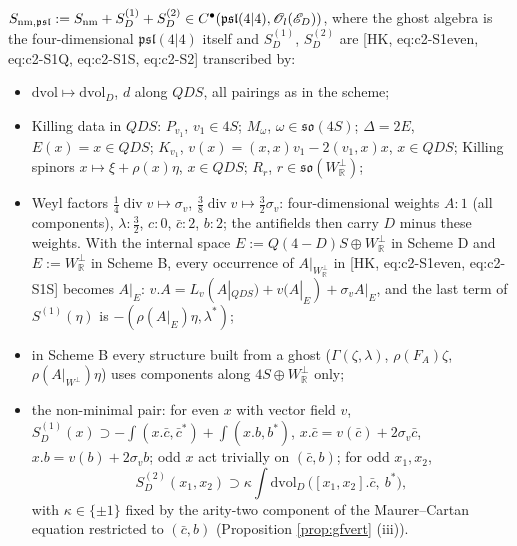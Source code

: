 \begin{definition}
\label{def:equiv}
$S_{{\rm nm},\mathfrak{psl}}:=S_{\rm nm}+S^{(1)}_D+S^{(2)}_D\in C^\bullet(\mathfrak{psl}(4|4),\mathscr O_l(\mathscr E_D))$, where the ghost algebra is the four-dimensional $\mathfrak{psl}(4|4)$ itself and $S^{(1)}_D$, $S^{(2)}_D$ are [HK, eq:c2-S1even, eq:c2-S1Q, eq:c2-S1S, eq:c2-S2] transcribed by:
\begin{itemize}
\item[T1] $\mathrm{dvol}\mapsto\mathrm{dvol}_D$, $d$ along $QDS$, all pairings as in the scheme;
\item[T2] Killing data in $QDS$: $P_{v_1}$, $v_1\in 4S$; $M_\omega$, $\omega\in\mathfrak{so}(4S)$; $\Delta=2E$, $E(x)=x\in QDS$; $K_{v_1}$, $v(x)=(x,x)v_1-2(v_1,x)x$, $x\in QDS$; Killing spinors $x\mapsto\xi+\rho(x)\eta$, $x\in QDS$; $R_r$, $r\in\mathfrak{so}(W^\perp_{\mathbb R})$;
\item[T3] Weyl factors $\frac14\operatorname{div}v\mapsto\sigma_v$, $\frac38\operatorname{div}v\mapsto\frac32\sigma_v$: four-dimensional weights $A\colon1$ (all components), $\lambda\colon\frac32$, $c\colon0$, $\bar c\colon2$, $b\colon2$; the antifields then carry $D$ minus these weights. With the internal space $E:=Q(4{-}D)S\oplus W^\perp_{\mathbb R}$ in Scheme D and $E:=W^\perp_{\mathbb R}$ in Scheme B, every occurrence of $A|_{W^\perp_{\mathbb R}}$ in [HK, eq:c2-S1even, eq:c2-S1S] becomes $A|_E$: $v.A=L_v(A|_{QDS})+v(A|_E)+\sigma_vA|_E$, and the last term of $S^{(1)}(\eta)$ is $-(\rho(A|_E)\eta,\lambda^*)$;
\item[T4] in Scheme B every structure built from a ghost ($\Gamma(\zeta,\lambda)$, $\rho(F_A)\zeta$, $\rho(A|_{W^\perp})\eta$) uses components along $4S\oplus W^\perp_{\mathbb R}$ only;
\item[T5] the non-minimal pair: for even $x$ with vector field $v$, $S^{(1)}_D(x)\supset-\int(x.\bar c,\bar c^*)+\int(x.b,b^*)$, $x.\bar c=v(\bar c)+2\sigma_v\bar c$, $x.b=v(b)+2\sigma_vb$; odd $x$ act trivially on $(\bar c,b)$; for odd $x_1,x_2$,
\[
S^{(2)}_D(x_1,x_2)\supset\kappa\int\mathrm{dvol}_D\,\big([x_1,x_2].\bar c,\ b^*\big),
\]
with $\kappa\in\{\pm1\}$ fixed by the arity-two component of the Maurer--Cartan equation restricted to $(\bar c,b)$ (Proposition \ref{prop:gfvert} (iii)).
\end{itemize}
\end{definition}


